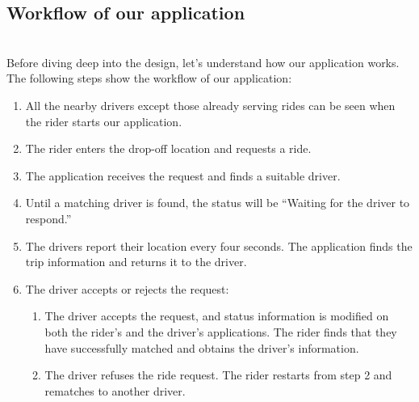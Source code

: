 

\subsection{Workflow of our application}\label{Z4oMYGyfgAdPaK3vHlVDs}
\\
Before diving deep into the design, let's understand how our application works. The following steps show the workflow of our application:

\begin{enumerate}
\item
\protect{}\label{ka24GPAxr-5JZPhmjOotw}
All the nearby drivers except those already serving rides can be seen when the rider starts our application.
\item
\protect{}\label{TPMRcOuGgT-GMiyVIhEY0}
The rider enters the drop-off location and requests a ride.
\item
\protect{}\label{zBU3pbuC4El78naUseSKL}
The application receives the request and finds a suitable driver.
\item
\protect{}\label{SgyfwTvs3251Y7BXRRTVS}
Until a matching driver is found, the status will be ``Waiting for the driver to respond.''
\item
\protect{}\label{mhS-UAjDyEi4zc8PJxNi9}
The drivers report their location every four seconds. The application finds the trip information and returns it to the driver.
\item
\protect{}\label{_S9OYlgkBpdmKLnbGyFZA}
The driver accepts or rejects the request:

\begin{enumerate}
\item
The driver accepts the request, and status information is modified on both the rider's and the driver's applications. The rider finds that they have successfully matched and obtains the driver's information.
\item
The driver refuses the ride request. The rider restarts from step 2 and rematches to another driver.
\end{enumerate}
\end{enumerate}

